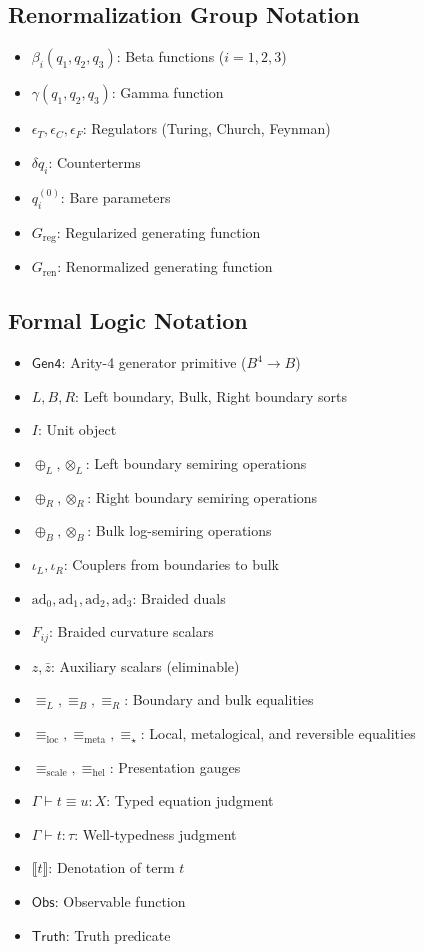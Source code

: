 \subsection{Renormalization Group Notation}
\begin{itemize}
\item $\beta_i(q_1,q_2,q_3)$: Beta functions ($i = 1,2,3$)
\item $\gamma(q_1,q_2,q_3)$: Gamma function
\item $\epsilon_T, \epsilon_C, \epsilon_F$: Regulators (Turing, Church, Feynman)
\item $\delta q_i$: Counterterms
\item $q_i^{(0)}$: Bare parameters
\item $G_{\text{reg}}$: Regularized generating function
\item $G_{\text{ren}}$: Renormalized generating function
\end{itemize}

\subsection{Formal Logic Notation}
\begin{itemize}
\item $\mathsf{Gen4}$: Arity-4 generator primitive ($B^4 \to B$)
\item $L, B, R$: Left boundary, Bulk, Right boundary sorts
\item $I$: Unit object
\item $\oplus_L, \otimes_L$: Left boundary semiring operations
\item $\oplus_R, \otimes_R$: Right boundary semiring operations
\item $\oplus_B, \otimes_B$: Bulk log-semiring operations
\item $\iota_L, \iota_R$: Couplers from boundaries to bulk
\item $\text{ad}_0, \text{ad}_1, \text{ad}_2, \text{ad}_3$: Braided duals
\item $F_{ij}$: Braided curvature scalars
\item $z, \bar{z}$: Auxiliary scalars (eliminable)
\item $\equiv_L, \equiv_B, \equiv_R$: Boundary and bulk equalities
\item $\equiv_{\text{loc}}, \equiv_{\text{meta}}, \equiv_\star$: Local, metalogical, and reversible equalities
\item $\equiv_{\text{scale}}, \equiv_{\text{hel}}$: Presentation gauges
\item $\Gamma \vdash t \equiv u : X$: Typed equation judgment
\item $\Gamma \vdash t : \tau$: Well-typedness judgment
\item $\llbracket t \rrbracket$: Denotation of term $t$
\item $\mathsf{Obs}$: Observable function
\item $\mathsf{Truth}$: Truth predicate
\end{itemize}

